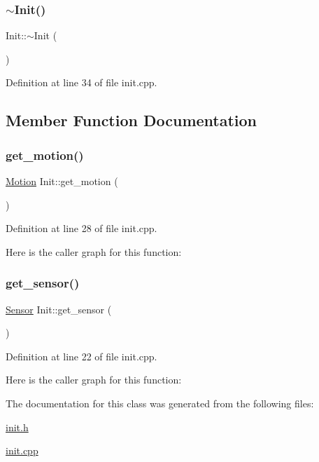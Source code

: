 \mbox{\label{class_init_a67d5c94cb965fa3b774e969cfb4969d1}} 
\subsubsection{\texorpdfstring{$\sim$\+Init()}{~Init()}}
{\footnotesize\ttfamily Init\+::$\sim$\+Init (\begin{DoxyParamCaption}{ }\end{DoxyParamCaption})}



Definition at line 34 of file init.\+cpp.



\subsection{Member Function Documentation}
\mbox{\label{class_init_a2f0137392b84da9c02d9c4d892e44534}} 
\subsubsection{\texorpdfstring{get\+\_\+motion()}{get\_motion()}}
{\footnotesize\ttfamily \mbox{\hyperlink{class_motion}{Motion}} Init\+::get\+\_\+motion (\begin{DoxyParamCaption}{ }\end{DoxyParamCaption})}



Definition at line 28 of file init.\+cpp.

Here is the caller graph for this function\+:
\mbox{\label{class_init_a8d5597fb9e9bfb192a235cdee32ede2d}} 
\subsubsection{\texorpdfstring{get\+\_\+sensor()}{get\_sensor()}}
{\footnotesize\ttfamily \mbox{\hyperlink{class_sensor}{Sensor}} Init\+::get\+\_\+sensor (\begin{DoxyParamCaption}{ }\end{DoxyParamCaption})}



Definition at line 22 of file init.\+cpp.

Here is the caller graph for this function\+:


The documentation for this class was generated from the following files\+:\begin{DoxyCompactItemize}
\item 
\mbox{\hyperlink{init_8h}{init.\+h}}\item 
\mbox{\hyperlink{init_8cpp}{init.\+cpp}}\end{DoxyCompactItemize}
